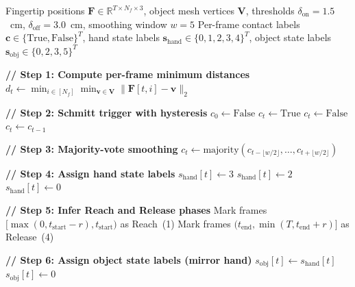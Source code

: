 \documentclass[sigconf, screen, review, anonymous]{acmart}
\begin{document}
\begin{algorithm}[t]
\caption{Schmitt Trigger Contact Detection with State Assignment}
\label{alg:schmitt}
\begin{algorithmic}[1]
\REQUIRE Fingertip positions $\mathbf{F} \in \mathbb{R}^{T \times N_f \times 3}$, object mesh vertices $\mathbf{V}$, thresholds $\delta_{\text{on}} = 1.5$~cm, $\delta_{\text{off}} = 3.0$~cm, smoothing window $w = 5$
\ENSURE Per-frame contact labels $\mathbf{c} \in \{\text{True}, \text{False}\}^T$, hand state labels $\mathbf{s}_{\text{hand}} \in \{0,1,2,3,4\}^T$, object state labels $\mathbf{s}_{\text{obj}} \in \{0,2,3,5\}^T$

\STATE \textbf{// Step 1: Compute per-frame minimum distances}
    \STATE $d_t \leftarrow \min_{i \in [N_f]} \min_{\mathbf{v} \in \mathbf{V}} \| \mathbf{F}[t, i] - \mathbf{v} \|_2$
\ENDFOR

\STATE \textbf{// Step 2: Schmitt trigger with hysteresis}
\STATE $c_0 \leftarrow \text{False}$
        \STATE $c_t \leftarrow \text{True}$ \hfill {}
        \STATE $c_t \leftarrow \text{False}$ \hfill {}
    \ELSE
        \STATE $c_t \leftarrow c_{t-1}$ \hfill {}
    \ENDIF
\ENDFOR

\STATE \textbf{// Step 3: Majority-vote smoothing}
    \STATE $c_t \leftarrow \text{majority}(c_{t-\lfloor w/2 \rfloor}, \ldots, c_{t+\lfloor w/2 \rfloor})$
    \hfill {}
\ENDFOR

\STATE \textbf{// Step 4: Assign hand state labels}
            \STATE $s_{\text{hand}}[t] \leftarrow 3$ \hfill {}
        \ELSE
            \STATE $s_{\text{hand}}[t] \leftarrow 2$ \hfill {}
        \ENDIF
    \ELSE
        \STATE $s_{\text{hand}}[t] \leftarrow 0$ \hfill {}
    \ENDIF
\ENDFOR

\STATE \textbf{// Step 5: Infer Reach and Release phases}
    \STATE Mark frames $[\max(0, t_{\text{start}} - r), t_{\text{start}})$ as Reach~(1)
    \STATE Mark frames $(t_{\text{end}}, \min(T, t_{\text{end}} + r)]$ as Release~(4)
\ENDFOR

\STATE \textbf{// Step 6: Assign object state labels (mirror hand)}
        \STATE $s_{\text{obj}}[t] \leftarrow s_{\text{hand}}[t]$ \hfill {}
    \ELSE
        \STATE $s_{\text{obj}}[t] \leftarrow 0$ \hfill {}
    \ENDIF
\ENDFOR
\end{algorithmic}
\end{algorithm}
\end{document}
